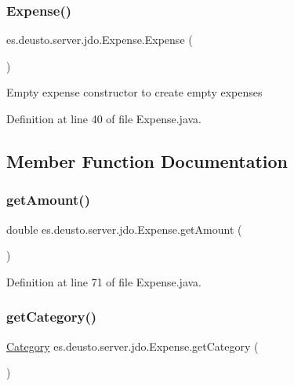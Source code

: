 \subsubsection{\texorpdfstring{Expense()}{Expense()}\hspace{0.1cm}{\footnotesize\ttfamily [2/2]}}
{\footnotesize\ttfamily es.\+deusto.\+server.\+jdo.\+Expense.\+Expense (\begin{DoxyParamCaption}{ }\end{DoxyParamCaption})}

Empty expense constructor to create empty expenses 

Definition at line 40 of file Expense.\+java.



\subsection{Member Function Documentation}
\mbox{\label{classes_1_1deusto_1_1server_1_1jdo_1_1_expense_ad877eb6362a3762e7943097000a46d9d}} 
\subsubsection{\texorpdfstring{get\+Amount()}{getAmount()}}
{\footnotesize\ttfamily double es.\+deusto.\+server.\+jdo.\+Expense.\+get\+Amount (\begin{DoxyParamCaption}{ }\end{DoxyParamCaption})}



Definition at line 71 of file Expense.\+java.

\mbox{\label{classes_1_1deusto_1_1server_1_1jdo_1_1_expense_a5fc577cffd2b708187c199ce2e8f0770}} 
\subsubsection{\texorpdfstring{get\+Category()}{getCategory()}}
{\footnotesize\ttfamily \hyperlink{enumes_1_1deusto_1_1server_1_1jdo_1_1_category}{Category} es.\+deusto.\+server.\+jdo.\+Expense.\+get\+Category (\begin{DoxyParamCaption}{ }\end{DoxyParamCaption})}



